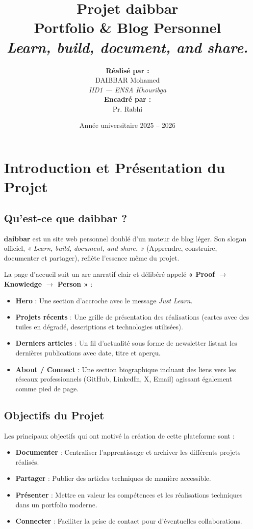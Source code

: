\documentclass[12pt,a4paper]{article}
\title{
    \vspace{2cm}
    \Huge \textbf{Projet daibbar} \\
    \Large Portfolio \& Blog Personnel \\
    \vspace{0.5cm}
    \large \textit{Learn, build, document, and share.}
    \vspace{2cm}
}
\author{
    \textbf{Réalisé par :} \\ DAIBBAR Mohamed \\ \textit{IID1 — ENSA Khouribga} \\[1cm]
    \textbf{Encadré par :} \\ Pr. Rabhi
}
\date{Année universitaire 2025 -- 2026}
\begin{document}
\maketitle
\thispagestyle{empty}
\newpage

\tableofcontents
\newpage

\section{Introduction et Présentation du Projet}

\subsection{Qu'est-ce que daibbar ?}
\textbf{daibbar} est un site web personnel doublé d'un moteur de blog léger. Son slogan officiel, \textit{« Learn, build, document, and share. »} (Apprendre, construire, documenter et partager), reflète l'essence même du projet. 

La page d'accueil suit un arc narratif clair et délibéré appelé \textbf{« Proof $\rightarrow$ Knowledge $\rightarrow$ Person »} :
\begin{itemize}
    \item \textbf{Hero} : Une section d'accroche avec le message \textit{Just Learn.}
    \item \textbf{Projets récents} : Une grille de présentation des réalisations (cartes avec des tuiles en dégradé, descriptions et technologies utilisées).
    \item \textbf{Derniers articles} : Un fil d'actualité sous forme de newsletter listant les dernières publications avec date, titre et aperçu.
    \item \textbf{About / Connect} : Une section biographique incluant des liens vers les réseaux professionnels (GitHub, LinkedIn, X, Email) agissant également comme pied de page.
\end{itemize}

\subsection{Objectifs du Projet}
Les principaux objectifs qui ont motivé la création de cette plateforme sont :
\begin{itemize}
    \item \textbf{Documenter} : Centraliser l'apprentissage et archiver les différents projets réalisés.
    \item \textbf{Partager} : Publier des articles techniques de manière accessible.
    \item \textbf{Présenter} : Mettre en valeur les compétences et les réalisations techniques dans un portfolio moderne.
    \item \textbf{Connecter} : Faciliter la prise de contact pour d'éventuelles collaborations.
\end{itemize}
\end{document}
